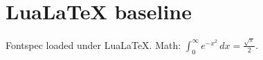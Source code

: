 \documentclass{article}
\begin{document}
\section{LuaLaTeX baseline}
Fontspec loaded under Lua\LaTeX. Math: $\int_0^\infty e^{-x^2}\,dx = \frac{\sqrt{\pi}}{2}$.
\end{document}
